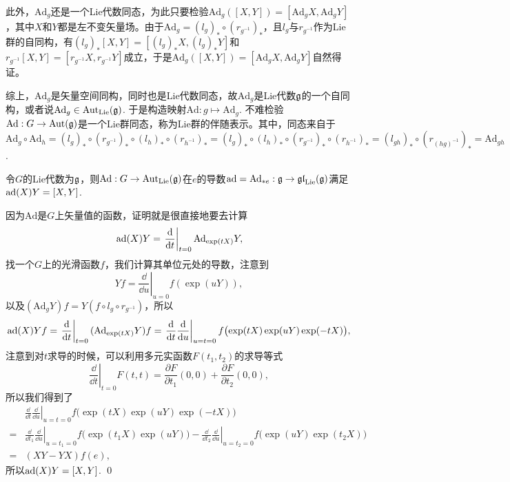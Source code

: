 此外，$\mathrm{Ad}_g$还是一个Lie代数同态，为此只要检验$\mathrm{Ad}_g([X,Y])=[\mathrm{Ad}_gX,\mathrm{Ad}_gY]$，其中$X$和$Y$都是左不变矢量场。由于$\mathrm{Ad}_g=(l_g)_*\circ (r_{g^{-1}})_*$，且$l_g$与$r_{g^{-1}}$作为Lie群的自同构，有$(l_g)_*[X,Y]=[(l_g)_*X,(l_g)_*Y]$和$r_{g^{-1}}[X,Y]=[r_{g^{-1}}X,r_{g^{-1}}Y]$成立，于是$\mathrm{Ad}_g([X,Y])=[\mathrm{Ad}_gX,\mathrm{Ad}_gY]$自然得证。

综上，$\mathrm{Ad}_g$是矢量空间同构，同时也是Lie代数同态，故$\mathrm{Ad}_g$是Lie代数${\mathfrak{g}}$的一个自同构，或者说$\mathrm{Ad}_g\in \mathrm{Aut}_{\mathrm{Lie}}({\mathfrak{g}})$. 于是构造映射$\mathrm{Ad}:g\mapsto \mathrm{Ad}_g$. 不难检验$\mathrm{Ad}:G\to \mathrm{Aut}({\mathfrak{g}})$是一个Lie群同态，称为Lie群的伴随表示。其中，同态来自于$\mathrm{Ad}_g\circ \mathrm{Ad}_h=(l_g)_*\circ (r_{g^{-1}})_*\circ (l_h)_*\circ (r_{h^{-1}})_*=(l_g)_*\circ (l_h)_*\circ (r_{g^{-1}})_*\circ (r_{h^{-1}})_*=(l_{gh})_*\circ (r_{(hg)^{-1}})_*=\mathrm{Ad}_{gh}$.


\begin{pro}
令$G$的Lie代数为${\mathfrak{g}}$，则$\mathrm{Ad}:G\to \mathrm{Aut}_{\mathrm{Lie}}({\mathfrak{g}})$在$e$的导数$\operatorname{ad}=\mathrm{Ad}_{*e}:{\mathfrak{g}}\to \mathfrak{gl}_{\mathrm{Lie}}({\mathfrak{g}})$满足$\operatorname{ad}(X)Y=[X,Y]$.
\end{pro}

\proof 
	因为$\mathrm{Ad}$是$G$上矢量值的函数，证明就是很直接地要去计算
	\[
		\operatorname{ad}(X)Y=\left.\frac{\mathrm{d}}{\mathrm{d} t}\right|_{t=0}\mathrm{Ad}_{\exp(tX)}Y,
	\]
	找一个$G$上的光滑函数$f$，我们计算其单位元处的导数，注意到
	\[
		Yf=\left.\frac{\dd}{\dd u}\right|_{u=0}f(\exp(uY)),
	\]
	以及$(\mathrm{Ad}_{g}Y)f=Y(f\circ l_g\circ r_{g^{-1}})$，所以
	\[
		\operatorname{ad}(X)Yf=\left.\frac{\mathrm{d}}{\mathrm{d} t}\right|_{t=0}(\mathrm{Ad}_{\exp(tX)}Y)f=\left.\frac{\mathrm{d}}{\mathrm{d} t}\frac{\mathrm{d}}{\mathrm{d} u}\right|_{u=t=0}f\bigl(\exp(tX)\exp(uY)\exp(-tX)\bigr),
	\]
	注意到对$t$求导的时候，可以利用多元实函数$F(t_1,t_2)$的求导等式
	\[
		\left.\frac{\dd}{\dd t}\right|_{t=0}F(t,t)=\frac{\partial F}{\partial t_1}(0,0)+\frac{\partial F}{\partial t_2}(0,0),
	\]
	所以我们得到了
	\[
	\begin{split}
		&\left.\frac{\dd}{\dd t}\frac{\dd}{\dd u}\right|_{u=t=0}f\bigl(\exp(tX)\exp(uY)\exp(-tX)\bigr)\\
		=&\left.\frac{\dd}{\dd t_1}\frac{\dd}{\dd u}\right|_{u=t_1=0}f\bigl(\exp(t_1X)\exp(uY)\bigr)-\left.\frac{\dd}{\dd t_2}\frac{\dd}{\dd u}\right|_{u=t_2=0}f\bigl(\exp(uY)\exp(t_2X)\bigr)\\
	=&(XY-YX)f(e),
	\end{split}
	\]
	所以$\operatorname{ad}(X)Y=[X,Y]$.
\qed

